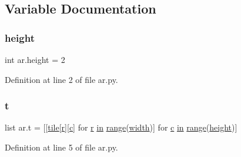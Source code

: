 \subsection{Variable Documentation}
\mbox{\label{namespacear_a73d70a34d44667e5e721d311f1c56608}} 
\subsubsection{\texorpdfstring{height}{height}}
{\footnotesize\ttfamily int ar.\+height = 2}



Definition at line 2 of file ar.\+py.

\mbox{\label{namespacear_a5d9cc14833c739838257a4cc1180a294}} 
\subsubsection{\texorpdfstring{t}{t}}
{\footnotesize\ttfamily list ar.\+t = \mbox{[}\mbox{[}\mbox{\hyperlink{namespacear_a66c6c345626b098fb365cdde45b3e604}{tile}}\mbox{[}\mbox{\hyperlink{_s_d_l__opengl_8h_a42ce7cdc612e53abee15043f80220d97}{r}}\mbox{]}\mbox{[}\mbox{\hyperlink{_s_d_l__opengl__glext_8h_a1f2d7f8147412c43ba2303a56f97ee73}{c}}\mbox{]} for \mbox{\hyperlink{_s_d_l__opengl_8h_a42ce7cdc612e53abee15043f80220d97}{r}} \mbox{\hyperlink{_s_d_l__opengl__glext_8h_a83ad0ee7f1e06b59c90271716e689080}{in}} \mbox{\hyperlink{_s_d_l__opengl__glext_8h_a73b00379db2c7ac5e30a3aa2954a50ee}{range}}(\mbox{\hyperlink{_s_d_l__opengl_8h_a9a82cf3caff84cabc4598e2619faac17}{width}})\mbox{]} for \mbox{\hyperlink{_s_d_l__opengl__glext_8h_a1f2d7f8147412c43ba2303a56f97ee73}{c}} \mbox{\hyperlink{_s_d_l__opengl__glext_8h_a83ad0ee7f1e06b59c90271716e689080}{in}} \mbox{\hyperlink{_s_d_l__opengl__glext_8h_a73b00379db2c7ac5e30a3aa2954a50ee}{range}}(\mbox{\hyperlink{_s_d_l__opengl_8h_aa352f2804b9902ac30769c00dde75d5f}{height}})\mbox{]}}



Definition at line 5 of file ar.\+py.

\mbox{\label{namespacear_a66c6c345626b098fb365cdde45b3e604}} 

